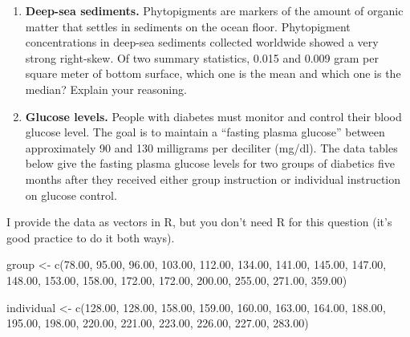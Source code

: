 \documentclass[
  letterpaper,
  DIV=11,
  numbers=noendperiod]{scrreprt}
\newenvironment{Shaded}{\begin{snugshade}}{\end{snugshade}}
\newcommand{\FloatTok}[1]{\textcolor[rgb]{0.68,0.00,0.00}{#1}}
\newcommand{\FunctionTok}[1]{\textcolor[rgb]{0.28,0.35,0.67}{#1}}
\newcommand{\NormalTok}[1]{\textcolor[rgb]{0.00,0.23,0.31}{#1}}
\newcommand{\OtherTok}[1]{\textcolor[rgb]{0.00,0.23,0.31}{#1}}
\begin{document}
\begin{enumerate}
\def\labelenumi{\arabic{enumi}.}
\setcounter{enumi}{1}
\item
  \textbf{Deep-sea sediments.} Phytopigments are markers of the amount
  of organic matter that settles in sediments on the ocean floor.
  Phytopigment concentrations in deep-sea sediments collected worldwide
  showed a very strong right-skew. Of two summary statistics, 0.015 and
  0.009 gram per square meter of bottom surface, which one is the mean
  and which one is the median? Explain your reasoning.
\item
  \textbf{Glucose levels.} People with diabetes must monitor and control
  their blood glucose level. The goal is to maintain a ``fasting plasma
  glucose'' between approximately 90 and 130 milligrams per deciliter
  (mg/dl). The data tables below give the fasting plasma glucose levels
  for two groups of diabetics five months after they received either
  group instruction or individual instruction on glucose control.
\end{enumerate}

I provide the data as vectors in R, but you don't need R for this
question (it's good practice to do it both ways).

\begin{Shaded}
\begin{Highlighting}[]
\NormalTok{group }\OtherTok{\textless{}{-}} \FunctionTok{c}\NormalTok{(}\FloatTok{78.00}\NormalTok{, }\FloatTok{95.00}\NormalTok{, }\FloatTok{96.00}\NormalTok{, }\FloatTok{103.00}\NormalTok{, }\FloatTok{112.00}\NormalTok{, }\FloatTok{134.00}\NormalTok{, }\FloatTok{141.00}\NormalTok{, }\FloatTok{145.00}\NormalTok{, }\FloatTok{147.00}\NormalTok{,}
    \FloatTok{148.00}\NormalTok{, }\FloatTok{153.00}\NormalTok{, }\FloatTok{158.00}\NormalTok{, }\FloatTok{172.00}\NormalTok{, }\FloatTok{172.00}\NormalTok{, }\FloatTok{200.00}\NormalTok{, }\FloatTok{255.00}\NormalTok{, }\FloatTok{271.00}\NormalTok{, }\FloatTok{359.00}\NormalTok{)}

\NormalTok{individual }\OtherTok{\textless{}{-}} \FunctionTok{c}\NormalTok{(}\FloatTok{128.00}\NormalTok{, }\FloatTok{128.00}\NormalTok{, }\FloatTok{158.00}\NormalTok{, }\FloatTok{159.00}\NormalTok{, }\FloatTok{160.00}\NormalTok{, }\FloatTok{163.00}\NormalTok{, }\FloatTok{164.00}\NormalTok{, }\FloatTok{188.00}\NormalTok{, }\FloatTok{195.00}\NormalTok{,}
    \FloatTok{198.00}\NormalTok{, }\FloatTok{220.00}\NormalTok{, }\FloatTok{221.00}\NormalTok{, }\FloatTok{223.00}\NormalTok{, }\FloatTok{226.00}\NormalTok{, }\FloatTok{227.00}\NormalTok{, }\FloatTok{283.00}\NormalTok{)}
\end{Highlighting}
\end{Shaded}
\end{document}

